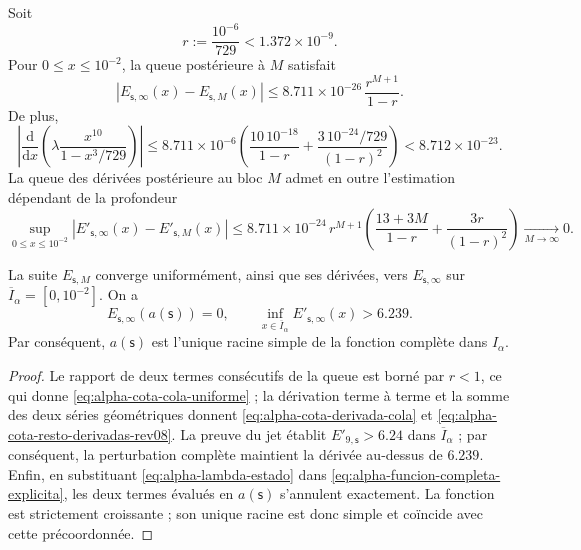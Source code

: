 Soit
\[
 r:=\frac{10^{-6}}{729}<1.372\mathbin{\times}10^{-9}.
\]
Pour \(0\leq x\leq10^{-2}\), la queue postérieure à \(M\) satisfait
\begin{equation}
 \left|E_{\mathsf s,\infty}(x)-E_{\mathsf s,M}(x)\right|
 \leq
 8.711\mathbin{\times}10^{-26}\,\frac{r^{M+1}}{1-r}.
 \label{eq:alpha-cota-cola-uniforme}
\end{equation}
De plus,
\begin{equation}
 \left|\frac{\mathrm d}{\mathrm dx}
  \left(\lambda\frac{x^{10}}{1-x^3/729}\right)\right|
 \leq 8.711\mathbin{\times}10^{-6}
 \left(\frac{10\,10^{-18}}{1-r}
 +\frac{3\,10^{-24}/729}{(1-r)^2}\right)
 <8.712\mathbin{\times}10^{-23}.
 \label{eq:alpha-cota-derivada-cola}
\end{equation}
La queue des dérivées postérieure au bloc \(M\) admet en outre l'estimation dépendant de la profondeur
\begin{equation}
 \sup_{0\le x\le10^{-2}}
 \left|E'_{\mathsf s,\infty}(x)-E'_{\mathsf s,M}(x)\right|
 \le 8.711\mathbin{\times}10^{-24}\,r^{M+1}
 \left(\frac{13+3M}{1-r}+\frac{3r}{(1-r)^2}\right)
 \xrightarrow[M\to\infty]{}0.
 \label{eq:alpha-cota-resto-derivadas-rev08}
\end{equation}

\begin{theorem}
\label{thm:alpha-raiz-completa-explicita}
La suite \(E_{\mathsf s,M}\) converge uniformément, ainsi que ses
dérivées, vers \(E_{\mathsf s,\infty}\) sur
\(\overline I_\alpha=[0,10^{-2}]\). On a
\begin{equation}
 E_{\mathsf s,\infty}(a(\mathsf s))=0,
 \qquad
 \inf_{x\in\overline I_\alpha}
 E'_{\mathsf s,\infty}(x)>6.239.
 \label{eq:alpha-raiz-y-derivada-completas}
\end{equation}
Par conséquent, \(a(\mathsf s)\) est l'unique racine simple de la fonction complète dans \(I_\alpha\).
\end{theorem}

\begin{proof}
Le rapport de deux termes consécutifs de la queue est borné par \(r<1\),
ce qui donne \eqref{eq:alpha-cota-cola-uniforme} ; la dérivation terme à
terme et la somme des deux séries géométriques donnent
\eqref{eq:alpha-cota-derivada-cola} et
\eqref{eq:alpha-cota-resto-derivadas-rev08}. La preuve du jet établit
\(E'_{9,\mathsf s}>6.24\) dans \(\overline I_\alpha\) ; par conséquent, la
perturbation complète maintient la dérivée au-dessus de \(6.239\).
Enfin, en substituant \eqref{eq:alpha-lambda-estado} dans
\eqref{eq:alpha-funcion-completa-explicita}, les deux termes évalués en
\(a(\mathsf s)\) s'annulent exactement. La fonction est strictement
croissante ; son unique racine est donc simple et coïncide avec cette précoordonnée.
\end{proof}

